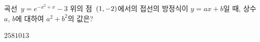 곡선~$y=e^{-x^2+x}-3$ 위의 점~$(1{,}\mkern3mu\mathopen{}-2)$에서의 접선의 방정식이 $y=ax+b$일 때, 상수 $a$, $b$에 대하여 $a^2+b^2$의 값은?
\begin{choices32}{$2$}{$5$}{$8$}{$10$}{$13$}\end{choices32}
